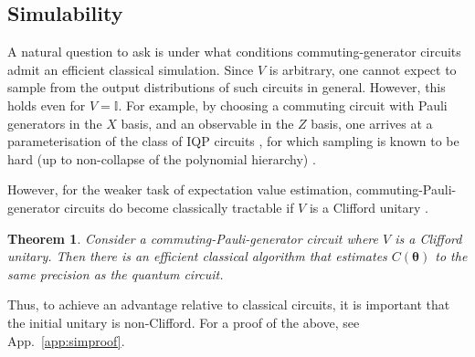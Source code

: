 \documentclass[a4paper,twocolumn,11pt]{quantumarticle}
\newtheorem{theorem}{Theorem}
\renewcommand{\vec}{\boldsymbol}
\begin{document}
\subsection{Simulability}\label{sec:simulate}
A natural question to ask is under what conditions commuting-generator circuits admit an efficient classical simulation. Since $V$ is arbitrary, one cannot expect to sample from the output distributions of such circuits in general. However, this holds even for $V=\mathbb{I}$. For example, by choosing a commuting circuit with Pauli generators in the $X$ basis, and an observable in the $Z$ basis, one arrives at a parameterisation of the class of IQP circuits \cite{bremner2016average,ni2012commuting}, for which sampling is known to be hard (up to non-collapse of the polynomial hierarchy) \cite{bremner2016average}. 

However, for the weaker task of expectation value estimation, commuting-Pauli-generator circuits do become classically tractable if $V$ is a Clifford unitary \cite{ni2012commuting}.

%
\begin{theorem}\label{thm:sim}
    Consider a commuting-Pauli-generator circuit where $V$ is a Clifford unitary. Then there is an efficient classical algorithm that estimates $C(\vec{\theta})$ to the same precision as the quantum circuit.
\end{theorem}
%
Thus, to achieve an advantage relative to classical circuits, it is important that the initial unitary is non-Clifford. For a proof of the above, see App.\ \ref{app:simproof}. 
\end{document}
